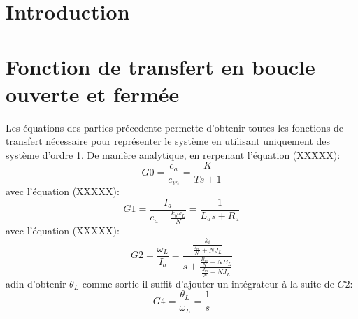 \documentclass{udes_rapport} %
\begin{document}




\newpage

\tableofcontents
\newpage


\listoffigures
\newpage



\setcounter{page}{1} %
\section{Introduction}

\section{Fonction de transfert en boucle ouverte et fermée}
Les équations des parties précedente permette d'obtenir toutes les fonctions de transfert nécessaire pour représenter le système en utilisant uniquement des système d'ordre 1. De manière analytique, en rerpenant l'équation (XXXXX):
\[	G0 = \frac{e_a}{e_{in}} = \frac{K}{Ts + 1}	\]
avec l'équation (XXXXX):
\[	G1 = \frac{I_a}{e_a - \frac{k_b \omega_L}{N}} = \frac{1}{L_a s + R_a}						\]
avec l'équation (XXXXX):
\[	G2 = \frac{\omega_L}{I_a} = \frac{\frac{k_i}{\frac{J_m}{N}+N J_L}}{s + \frac{\frac{B_m}{N} + N B_L}{\frac{J_m}{N}+N J_L}}	\]
adin d'obtenir $\theta _L$ comme sortie il suffit d'ajouter un intégrateur à la suite de $G2$:
\[	G4 = \frac{\theta _L}{\omega _L} = \frac{1}{s}	\]
\end{document}
